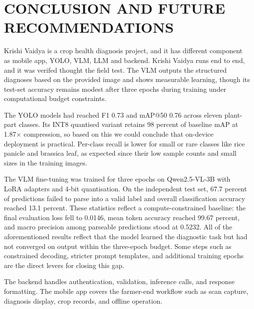
\chapter{CONCLUSION AND FUTURE RECOMMENDATIONS}


Krishi Vaidya is a crop health diagnosis project, and it has different component as mobile app, YOLO, VLM, LLM and backend.  Krishi Vaidya runs end to end, and it was verifed thought the field test. The VLM
outputs the structured diagnoses based on the provided image and shows measurable learning, though its
test-set accuracy remains modest after three epochs during training under
computational budget constraints.

The YOLO models had reached F1 0.73 and mAP@50 0.76 across eleven plant-part
classes. Its INT8 quantised variant retains 98 percent of baseline mAP at
1.87$\times$ compression, so based on this we could conclude that on-device deployment is practical. Per-class
recall is lower for small or rare classes like rice panicle and brassica
leaf, as expected since their low sample counts and small sizes in the
training images.

The VLM fine-tuning was trained for three epochs on Qwen2.5-VL-3B with LoRA
adapters and 4-bit quantisation. On the independent test set, 67.7 percent
of predictions failed to parse into a valid label and overall classification
accuracy reached 13.1 percent. These statistics reflect a compute-constrained
baseline: the final evaluation loss fell to 0.0146, mean token accuracy
reached 99.67 percent, and macro precision among parseable predictions stood
at 0.5232. All of the aforementioned results reflect that the model learned the diagnostic task but had not
converged on output within the three-epoch budget. Some steps such as
constrained decoding, stricter prompt templates, and additional training
epochs are the direct levers for closing this gap.

The backend handles authentication, validation, inference calls, and response
formatting. The mobile app covers the farmer-end workflow such as scan capture,
diagnosis display, crop records, and offline operation. 


